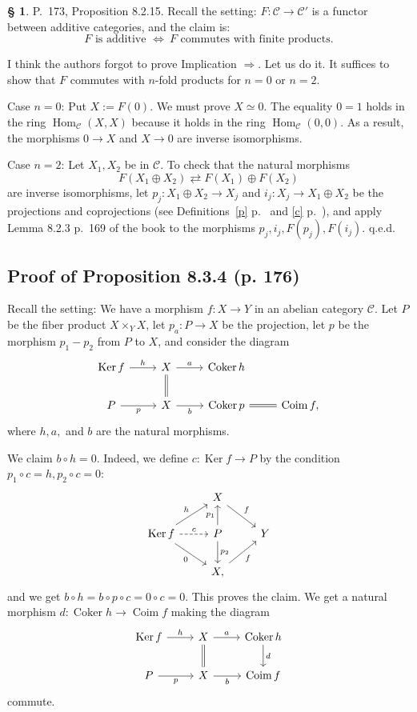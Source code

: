 \documentclass[12pt]{article}%
\theoremstyle{remark}
\theoremstyle{definition}
\newtheorem{s}[thm]{\S}%
\newcommand{\C}{\mathcal C}
\newcommand{\ssi}{\Leftrightarrow}%
\newcommand{\then}{\Rightarrow}
\DeclareMathOperator{\Coim}{Coim}
\DeclareMathOperator{\Coker}{Coker}
\DeclareMathOperator{\Hom}{Hom}%
\DeclareMathOperator{\Ker}{Ker}
\begin{document}
\begin{s} 
P.~173, Proposition 8.2.15. Recall the setting: $F:\C\to\C'$ is a functor between additive categories, and the claim is: 
$$
F\text{ is additive }\ssi\ F\text{ commutes with finite products}.
$$ 

I think the authors forgot to prove Implication $\then$. Let us do it. It suffices to show that $F$ commutes with $n$-fold products for $n=0$ or $n=2$. 

Case $n=0$: Put $X:=F(0)$. We must prove $X\simeq 0$. The equality $0=1$ holds in the ring $\Hom_\C(X,X)$ because it holds in the ring $\Hom_\C(0,0)$. As a result, the morphisms $0\to X$ and $X\to 0$ are inverse isomorphisms. 

Case $n=2$: Let $X_1,X_2$ be in $\C$. To check that the natural morphisms 
%
\begin{equation}\label{173} 
F(X_1\oplus X_2)\rightleftarrows F(X_1)\oplus F(X_2)
\end{equation} 
%
are inverse isomorphisms, let $p_j:X_1\oplus X_2\to X_j$ and $i_j:X_j\to X_1\oplus X_2$ be the projections and coprojections (see Definitions~\ref{p} p.~\pageref{p} and \ref{c} p.~\pageref{c}), and apply Lemma 8.2.3 p.~169 of the book to the morphisms $p_j,i_j,F(p_j),F(i_j)$. q.e.d.
\end{s}


\subsection{Proof of Proposition 8.3.4 (p. 176)}

Recall the setting: We have a morphism $f:X\to Y$ in an abelian category $\C$. Let $P$ be the fiber product $X\times_YX$, let $p_a:P\to X$ be the projection, let $p$ be the morphism $p_1-p_2$ from $P$ to $X$, and consider the diagram 
$$
\begin{tikzcd}
\Ker f\ar{r}{h} &X\ar[equal]{d}\ar{r}{a}&\Coker h\\ 
P\ar{r}[swap]{p}&X\ar{r}[swap]{b}       &\Coker p\ar[equal]{r}&\Coim f,
\end{tikzcd}
$$ 
where $h,a,$ and $b$ are the natural morphisms. 

We claim $b\circ h=0$. Indeed, we define $c:\Ker f\to P$ by the condition $p_1\circ c=h,p_2\circ c=0$: 
$$
\begin{tikzcd}
{}&X\ar{dr}{f}\\ 
\Ker f\ar{ur}{h}\ar{dr}[swap]{0}\ar[dashed]{r}{c}&P\ar{u}{p_1}\ar{d}{p_2}&Y\\ 
{}&X\ar{ur}[swap]{f},
\end{tikzcd}
$$
and we get $b\circ h=b\circ p\circ c=0\circ c=0$. This proves the claim. We get a natural morphism $d:\Coker h\to\Coim f$ making the diagram 
$$
\begin{tikzcd}
\Ker f\ar{r}{h}&X\ar[equal]{d}\ar{r}{a}&\Coker h\ar{d}{d}\\ 
P\ar{r}[swap]{p}&X\ar{r}[swap]{b}&\Coim f
\end{tikzcd}
$$ 
commute. 
\end{document}
